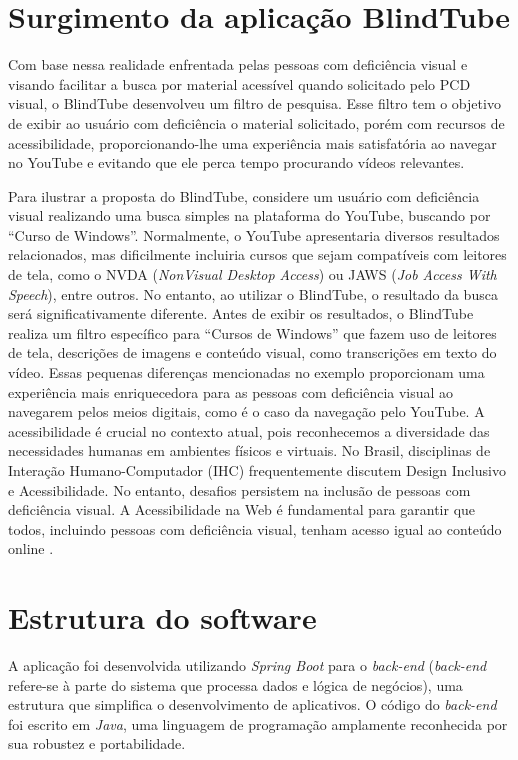 \documentclass[12pt]{article}
\begin{document}
\section{Surgimento da aplicação BlindTube}

Com base nessa realidade enfrentada pelas pessoas com deficiência visual e visando facilitar a busca por material acessível quando solicitado pelo PCD visual, o BlindTube desenvolveu um filtro de pesquisa. Esse filtro tem o objetivo de exibir ao usuário com deficiência o material solicitado, porém com recursos de acessibilidade, proporcionando-lhe uma experiência mais satisfatória ao navegar no YouTube e evitando que ele perca tempo procurando vídeos relevantes.

Para ilustrar a proposta do BlindTube, considere um usuário com deficiência visual realizando uma busca simples na plataforma do YouTube, 
buscando por ``Curso de Windows''. Normalmente, o YouTube apresentaria diversos resultados relacionados, mas dificilmente incluiria cursos que sejam compatíveis com leitores de tela, 
como o NVDA (\textit{NonVisual Desktop Access}) ou JAWS (\textit{Job Access With Speech}), entre outros. No entanto, ao utilizar o BlindTube, o resultado da busca será significativamente diferente. Antes de exibir os resultados, o BlindTube realiza um filtro específico para ``Cursos de Windows'' que fazem uso de leitores de tela, descrições de imagens e conteúdo visual, como transcrições em texto do vídeo. Essas pequenas diferenças mencionadas no exemplo proporcionam uma experiência mais enriquecedora para as pessoas com deficiência visual ao navegarem pelos meios digitais, como é o caso da navegação pelo YouTube.
A acessibilidade é crucial no contexto atual, pois reconhecemos a diversidade das necessidades humanas em ambientes físicos e virtuais. No Brasil, disciplinas de Interação Humano-Computador (IHC) frequentemente discutem Design Inclusivo e Acessibilidade. No entanto, desafios persistem na inclusão de pessoas com deficiência visual. A Acessibilidade na Web é fundamental para garantir que todos, incluindo pessoas com deficiência visual, tenham acesso igual ao conteúdo online \cite{proedad2023}.

\section{Estrutura do software}

A aplicação foi desenvolvida utilizando \textit{Spring Boot} para o \textit{back-end} (\textit{back-end} refere-se à parte do sistema que processa dados e lógica de negócios), uma estrutura que simplifica o desenvolvimento de aplicativos. O código do \textit{back-end} foi escrito em \textit{Java}, uma linguagem de programação amplamente reconhecida por sua robustez e portabilidade.
\end{document}
